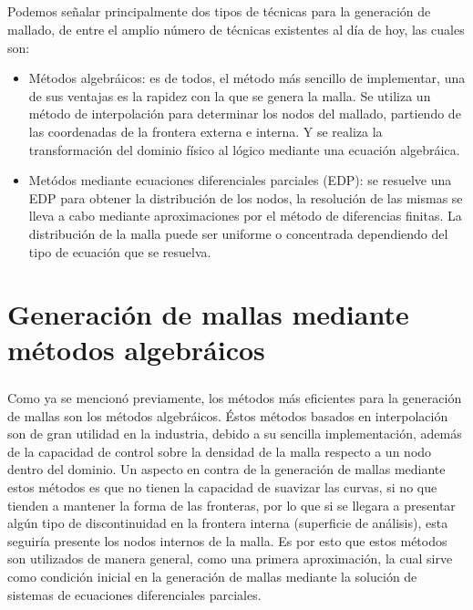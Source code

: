\documentclass[letterpaper, openright, 12pt]{book}
\begin{document}
		\paragraph*{}
			Podemos señalar principalmente dos tipos de técnicas para la generación de mallado, de entre el amplio número de técnicas existentes al día de hoy, las cuales son:
			\begin{itemize}
				\item Métodos algebráicos: es de todos, el método más sencillo de implementar, una de sus ventajas es la rapidez con la que se genera la malla. Se utiliza un método de interpolación para determinar los nodos del mallado, partiendo de las coordenadas de la frontera externa e interna. Y se realiza la transformación del dominio físico al lógico mediante una ecuación algebráica.
				\item Metódos mediante  ecuaciones diferenciales parciales (EDP): se resuelve una EDP para obtener la distribución de los nodos, la resolución de las mismas se lleva a cabo mediante aproximaciones por el método de diferencias finitas.  La distribución de la malla puede ser uniforme o concentrada dependiendo del tipo de ecuación que se resuelva.
			\end{itemize}
%
%
%
%
%		

%
%
%
%
%
\chapter{Generación de mallas mediante métodos algebráicos}
	\paragraph*{}
		Como ya se mencionó previamente, los métodos más eficientes para la generación de mallas son los métodos algebráicos. Éstos métodos basados en interpolación son de gran utilidad en la industria, debido a su sencilla implementación, además de la capacidad de control sobre la densidad de la malla respecto a un nodo dentro del dominio. Un aspecto en contra de la generación de mallas mediante estos métodos es que no tienen la capacidad de suavizar las curvas, si no que tienden a mantener la forma de las fronteras, por lo que si se llegara a presentar algún tipo de discontinuidad en la frontera interna (superficie de análisis), esta seguiría presente los nodos internos de la malla. Es por esto que estos métodos son utilizados de manera general, como una primera aproximación, la cual sirve como condición inicial en la generación de mallas mediante la solución de sistemas de ecuaciones diferenciales parciales.\cite{farrashkhalvat}
\end{document}
